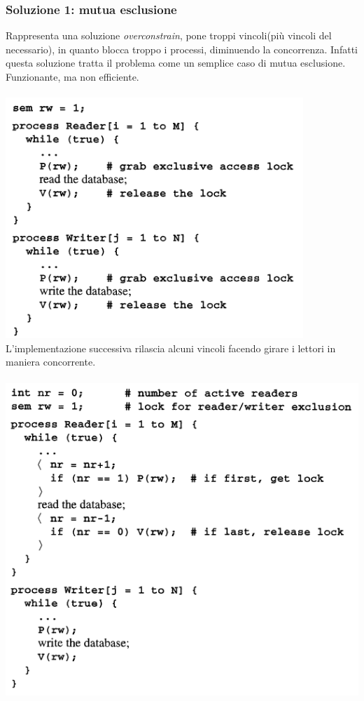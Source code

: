 \documentclass[10pt,a4paper]{article}
\begin{document}
\subsubsection{Soluzione 1: mutua esclusione}
Rappresenta una soluzione \textit{overconstrain}, pone troppi vincoli(più vincoli del necessario), in quanto blocca troppo i processi, diminuendo la concorrenza. Infatti questa soluzione tratta il problema come un semplice caso di mutua esclusione. Funzionante, ma non efficiente. \\ \\
\includegraphics[scale=0.41]{img/over.png} \\
\bigskip 
L'implementazione successiva rilascia alcuni vincoli facendo girare i lettori in maniera concorrente.\\ \\
\includegraphics[scale=0.41]{img/over2.png} \\
\end{document}
